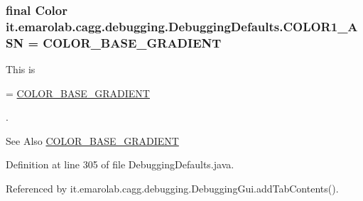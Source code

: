 \hypertarget{classit_1_1emarolab_1_1cagg_1_1debugging_1_1DebuggingDefaults_abb22e10517cc942779a8554557e00a05}{
\subsubsection[{C\-O\-L\-O\-R1\-\_\-\-A\-S\-N}]{\setlength{\rightskip}{0pt plus 5cm}final Color it.\-emarolab.\-cagg.\-debugging.\-Debugging\-Defaults.\-C\-O\-L\-O\-R1\-\_\-\-A\-S\-N = {\bf C\-O\-L\-O\-R\-\_\-\-B\-A\-S\-E\-\_\-\-G\-R\-A\-D\-I\-E\-N\-T}\hspace{0.3cm}{\ttfamily [static]}}}\label{classit_1_1emarolab_1_1cagg_1_1debugging_1_1DebuggingDefaults_abb22e10517cc942779a8554557e00a05}
This is
\begin{DoxyCode}
= \hyperlink{classit_1_1emarolab_1_1cagg_1_1debugging_1_1DebuggingDefaults_a17491ab8ed655381e8f8cc34e9d3b670}{COLOR\_BASE\_GRADIENT} 
\end{DoxyCode}
 . \begin{DoxySeeAlso}{See Also}
\hyperlink{classit_1_1emarolab_1_1cagg_1_1debugging_1_1DebuggingDefaults_a17491ab8ed655381e8f8cc34e9d3b670}{C\-O\-L\-O\-R\-\_\-\-B\-A\-S\-E\-\_\-\-G\-R\-A\-D\-I\-E\-N\-T} 
\end{DoxySeeAlso}


Definition at line 305 of file Debugging\-Defaults.\-java.



Referenced by it.\-emarolab.\-cagg.\-debugging.\-Debugging\-Gui.\-add\-Tab\-Contents().

